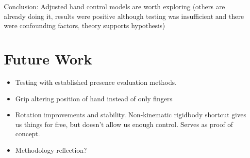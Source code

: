 Conclusion: Adjusted hand control models are worth exploring (others are already doing it, results were positive although testing was insufficient and there were confounding factors, theory supports hypothesis)

\section{Future Work}
\label{sec:futureWork}

\begin{itemize}
\item Testing with established presence evaluation methods.
\item Grip altering position of hand instead of only fingers
\item Rotation improvements and stability. Non-kinematic rigidbody shortcut gives us things for free, but doesn't allow us enough control. Serves as proof of concept.
\item Methodology reflection?
\end{itemize}